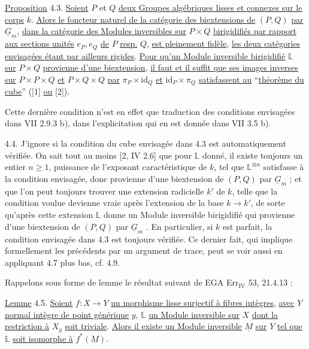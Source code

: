\underline{Proposition} 4.3. \underline{Soient} $P$ et $Q$ \underline{deux Groupes algébriques lisses et connexes sur le corps} $k$. \underline{Alors le foncteur naturel de la catégorie des biextensions de} $(P,Q)$ \underline{par} $\underline{G}_m$, \underline{dans la catégorie des Modules inversibles sur} $P \times Q$ \underline{birigidifiés par rapport aux sections unités} $e_P,e_Q$ \underline{de} $P$ \underline{resp.} $Q$,
\underline{est pleinement fidèle}, \underline{les deux catégories envisagées étant par ailleurs rigides}. \underline{Pour qu'un Module inversible birigidifié} $\mathbb{L}$ \underline{sur} $P \times Q$ \underline{provienne d'une biextension}, \underline{il faut et il suffit que ses images inverses sur} $P \times P \times Q$ \underline{et} $P \times Q \times Q$ \underline{par} $\pi_P \times \mathrm{id}_Q$ \underline{et} $\mathrm{id}_P \times \pi_Q$ \underline{satisfassent au} ``\underline{théorème du cube}'' ([1] \underline{ou} [2]).

Cette dernière condition n'est en effet que traduction des conditions envisagées dans VII 2.9.3 b), dans l'explicitation qui en est donnée dans VII 3.5 b).

4.4. J'ignore si la condition du cube envisagée dans 4.3 est automatiquement vérifiée. On sait tout au moins [2, IV 2.6] que pour $\mathbb{L}$ donné, il existe toujours un entier $n \geqslant 1$, puissance de l'exposant caractéristique de $k$, tel que $\mathbb{L}^{\otimes n}$ satisfasse à la condition envisagée, donc provienne d'une biextension de $(P,Q)$ par $\underline{G}_m$ ; et que l'on peut toujours trouver une extension radicielle $k'$ de $k$, telle que la condition voulue devienne vraie après l'extension de la base $k \longrightarrow k'$, de sorte qu'après cette extension $\mathbb{L}$ donne un Module inversible birigidifié qui provienne d'une biextension de $(P,Q)$ par $\underline{G}_m$ . En particulier, si $k$ est parfait, la condition envisagée dans 4.3 est toujours vérifiée. Ce dernier fait, qui implique formellement les précédents par un argument de trace, peut se voir aussi en appliquant 4.7 plus bas, cf. 4.9.

Rappelons sous forme de lemme le résultat suivant de EGA Err$_{\mathrm{IV}}$ 53, 21.4.13 :


\underline{Lemme} 4.5. \underline{Soient} $f : X \longrightarrow Y$ \underline{un morphisme lisse surjectif à fibres intègres}, \underline{avec} $Y$ \underline{normal intègre de point générique} $y$, $\mathbb{L}$ \underline{un Module inversible sur} $X$ \underline{dont la restriction à} $X_y$ \underline{soit triviale}. \underline{Alors il existe un Module inversible} $\underline{M}$ \underline{sur} $Y$ \underline{tel que} $\mathbb{L}$ \underline{soit isomorphe à} $f^*(\underline{M})$.

